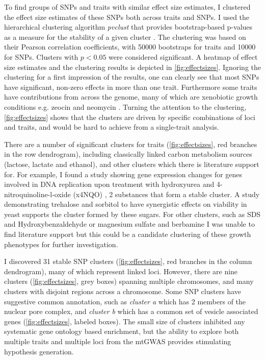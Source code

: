 To find groups of SNPs and traits with similar effect size estimates, I clustered the effect size estimates of these SNPs both across traits and SNPs. I used the hierarchical clustering algorithm \textit{pvclust} that provides bootstrap-based p-values as a measure for the stability of a given cluster \cite{Suzuki2006}. The clustering was based on their Pearson correlation coefficients, with \num{50000} bootstraps for traits and \num{10000} for SNPs. Clusters with \(p < 0.05\) were considered significant. A heatmap of effect size estimates and the clustering results is depicted in \cref{fig:effectsizes}. Ignoring the clustering for a first impression of the results, one can clearly see that most SNPs have significant, non-zero effects in more than one trait. Furthermore some traits have contributions from across the genome, many of which are xenobiotic growth conditions e.g. zeocin \cite{Krol2015} and neomycin \cite{Alamgir2010}. Turning the attention to the clustering, \cref{fig:effectsizes} shows that the clusters are driven by specific combinations of loci and traits, and would be hard to achieve from a single-trait analysis. 

There are a number of significant clusters for traits (\cref{fig:effectsizes}, red branches in the row dendrogram), including classically linked carbon metabolism sources (lactose, lactate and ethanol), and other clusters which there is literature support for. For example, I found a study showing gene expression changes for genes involved in DNA replication upon treatment with hydroxyurea and \num{4}-nitroquinoline-l-oxide (x4NQO) \citep{Elledge1990}, \num{2} substances that form a stable cluster. A study demonstrating trehalose and sorbitol to have synergistic effects on viability in yeast \citep{Hua2015} supports the cluster formed by these sugars. For other clusters, such as SDS and Hydroxybenzaldehyde or magnesium sulfate and berbamine I was unable to find literature support but this could be a candidate clustering of these growth phenotypes for further investigation. 

I discovered \num{31} stable SNP clusters (\cref{fig:effectsizes}, red branches in the column dendrogram), many of which represent linked loci. However, there are nine clusters (\cref{fig:effectsizes}, grey boxes) spanning multiple chromosomes, and many clusters with disjoint regions across a chromosome. Some SNP clusters have suggestive common annotation, such as \textit{cluster a} which has \num{2} members of the nuclear pore complex, and \textit{cluster b} which has a common set of vesicle associated genes (\cref{fig:effectsizes}, labeled boxes). The small size of clusters inhibited any systematic gene ontology based enrichment, but the ability to explore both multiple traits and multiple loci from the mtGWAS provides stimulating hypothesis generation. 

